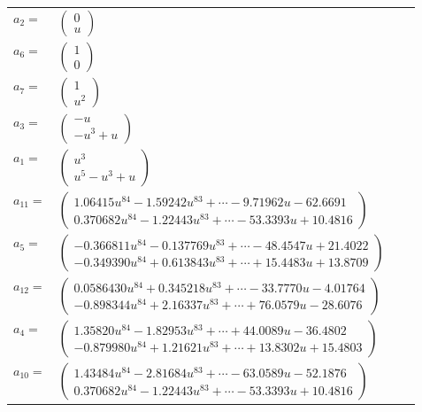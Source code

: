 \documentclass[1p]{elsarticle_modified}
\theoremstyle{definition}
\begin{document}
\begin{tabular}{m{7pt} m{180pt} m{7pt} m{180pt} }
\flushright $a_{2}=$&$\begin{pmatrix}0\\u\end{pmatrix}$ \\
\flushright $a_{6}=$&$\begin{pmatrix}1\\0\end{pmatrix}$ \\
\flushright $a_{7}=$&$\begin{pmatrix}1\\u^2\end{pmatrix}$ \\
\flushright $a_{3}=$&$\begin{pmatrix}- u\\- u^3+u\end{pmatrix}$ \\
\flushright $a_{1}=$&$\begin{pmatrix}u^3\\u^5- u^3+u\end{pmatrix}$ \\
\flushright $a_{11}=$&$\begin{pmatrix}1.06415 u^{84}-1.59242 u^{83}+\cdots-9.71962 u-62.6691\\0.370682 u^{84}-1.22443 u^{83}+\cdots-53.3393 u+10.4816\end{pmatrix}$ \\
\flushright $a_{5}=$&$\begin{pmatrix}-0.366811 u^{84}-0.137769 u^{83}+\cdots-48.4547 u+21.4022\\-0.349390 u^{84}+0.613843 u^{83}+\cdots+15.4483 u+13.8709\end{pmatrix}$ \\
\flushright $a_{12}=$&$\begin{pmatrix}0.0586430 u^{84}+0.345218 u^{83}+\cdots-33.7770 u-4.01764\\-0.898344 u^{84}+2.16337 u^{83}+\cdots+76.0579 u-28.6076\end{pmatrix}$ \\
\flushright $a_{4}=$&$\begin{pmatrix}1.35820 u^{84}-1.82953 u^{83}+\cdots+44.0089 u-36.4802\\-0.879980 u^{84}+1.21621 u^{83}+\cdots+13.8302 u+15.4803\end{pmatrix}$ \\
\flushright $a_{10}=$&$\begin{pmatrix}1.43484 u^{84}-2.81684 u^{83}+\cdots-63.0589 u-52.1876\\0.370682 u^{84}-1.22443 u^{83}+\cdots-53.3393 u+10.4816\end{pmatrix}$ \\

\end{tabular}
\end{document}

